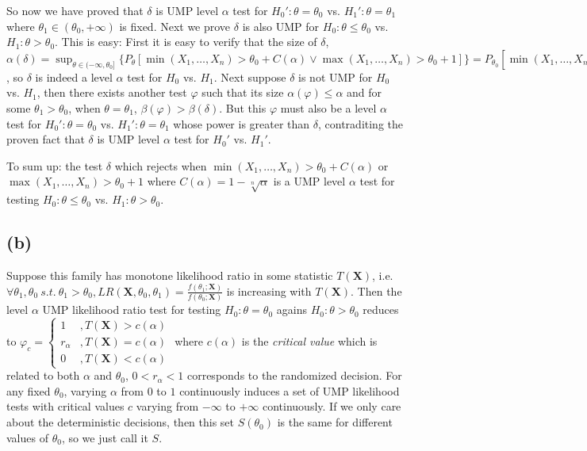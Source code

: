 So now we have proved that $\delta$ is UMP level $\alpha$ test for $H_0': \theta=\theta_0$ vs. $H_1': \theta=\theta_1$ where $\theta_1 \in (\theta_0, +\infty)$ is fixed. Next we prove $\delta$ is also UMP for $H_0: \theta \leq \theta_0$ vs. $H_1: \theta > \theta_0$. This is easy:
First it is easy to verify that the size of $\delta$,
$\alpha(\delta) = \sup_{\theta \in (-\infty, \theta_0]} \{
P_{\theta} \left[
\min(X_1, \dots, X_n)>\theta_0+C(\alpha)
\vee
\max(X_1, \dots, X_n)>\theta_0+1
\right] \} =
P_{\theta_0} \left[
\min(X_1, \dots, X_n)>\theta_0+1-\sqrt[n]{\alpha}
\vee
\max(X_1, \dots, X_n)>\theta_0+1
\right] = \alpha
$,
so $\delta$ is indeed a level $\alpha$ test for $H_0$ vs. $H_1$.
Next suppose $\delta$ is not UMP for $H_0$ vs. $H_1$, then there exists another test $\varphi$ such that its size $\alpha(\varphi) \leq \alpha$ and for some $\theta_1 > \theta_0$, when $\theta=\theta_1$, $\beta(\varphi) > \beta(\delta)$. But this $\varphi$ must also be a level $\alpha$ test for $H_0': \theta=\theta_0$ vs. $H_1': \theta=\theta_1$ whose power is greater than $\delta$, contraditing the proven fact that $\delta$ is UMP level $\alpha$ test for $H_0'$ vs. $H_1'$.

To sum up: the test $\delta$ which rejects when
$
\min(X_1, \dots, X_n) > \theta_0 + C(\alpha)
$
or
$
\max(X_1, \dots, X_n) > \theta_0 + 1
$
where
$
C(\alpha) = 1-\sqrt[n]{\alpha}
$
is a UMP level $\alpha$ test for testing $H_0: \theta \leq \theta_0$ vs. $H_1: \theta > \theta_0$.

\subsection*{(b)}
Suppose this family has monotone likelihood ratio in some statistic $T(\mathbf{X})$, i.e. \\
$
\forall \theta_1, \theta_0 ~ s.t. ~ \theta_1>\theta_0,
LR(\mathbf{X}, \theta_0, \theta_1) =
\frac{f(\theta_1; \mathbf{X})}{f(\theta_0; \mathbf{X})}
$
is increasing with $T(\mathbf{X})$.
Then the level $\alpha$ UMP likelihood ratio test for testing
$
H_0: \theta = \theta_0
$
agains
$
H_0: \theta > \theta_0
$
reduces to
$
\varphi_{c} = \left\{\begin{array}{cl}
1 & ,T(\mathbf{X}) > c(\alpha) \\
r_{\alpha} & ,T(\mathbf{X}) = c(\alpha) \\
0 & ,T(\mathbf{X}) < c(\alpha)
\end{array}\right.
$
where
$
c(\alpha)
$
is the \emph{critical value} which is related to both $\alpha$ and $\theta_0$,
$
0<r_{\alpha}<1
$ corresponds to the randomized decision.
For any fixed $\theta_0$, varying $\alpha$ from $0$ to $1$ continuously induces a set of UMP likelihood tests with critical values $c$ varying from $-\infty$ to $+\infty$ continuously. If we only care about the deterministic decisions, then this set
$S(\theta_0)$ is the same for different values of $\theta_0$, so we just call it $S$.

